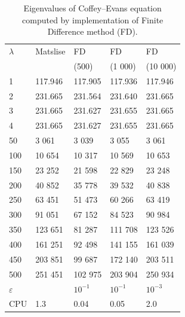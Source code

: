 \documentclass[11pt,a4paper,oneside,openright]{report} %
\begin{document}
\begin{table}[H]
\centering
\caption{Eigenvalues of Coffey--Evans equation computed by implementation of Finite Difference method (FD).}
\label{}
{\small
\begin{tabularx}{\textwidth}{l *{4}{X}}
\toprule
$\lambda$ & Matslise & FD  & FD  & FD  \\
 &  & (500) & (1 000) & (10 000) \\
\midrule
1 & 117.946 & 117.905 & 117.936  &  117.946 \\
2 & 231.665 & 231.564 & 231.640 & 231.665 \\
3 & 231.665 & 231.627 & 231.655 &  231.665 \\
4 & 231.665 & 231.627 & 231.655 & 231.665 \\
50 & 3 061 &  3 039 & 3 055 & 3 061 \\
100 & 10 654 & 10 317 & 10 569 & 10 653 \\
150 & 23 252 & 21 598 & 22 829 & 23 248 \\
200 & 40 852 & 35 778 & 39 532 & 40 838 \\
250 & 63 451 & 51 473 & 60 266 & 63 419 \\
300 & 91 051 & 67 152 & 84 523 & 90 984 \\
350 & 123 651 & 81 287 & 111 708 & 123 526 \\
400 & 161 251 & 92 498 & 141 155 & 161 039 \\
450 & 203 851 & 99 687 & 172 140 & 203 511 \\
500 & 251 451 & 102 975 & 203 904 & 250 934 \\
\midrule
$\varepsilon$ &  & $10^{-1}$ & $10^{-1}$ & $10^{-3}$ \\
CPU & 1.3 & 0.04 & 0.05 & 2.0 \\
\bottomrule
\end{tabularx}
}
\end{table}
\end{document}
